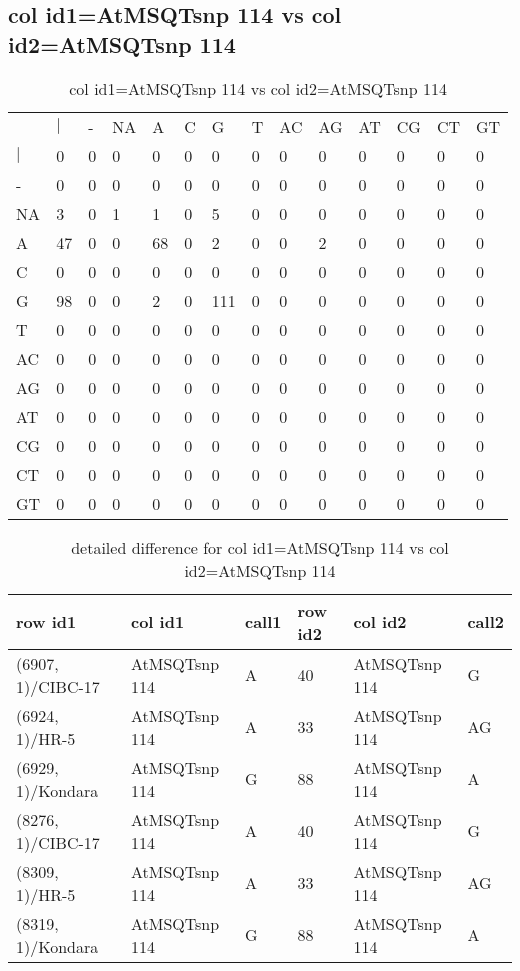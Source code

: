 \subsection{col id1=AtMSQTsnp 114 vs col id2=AtMSQTsnp 114}
\begin{center}
\begin{longtable}{|l|l|l|l|l|l|l|l|l|l|l|l|l|l|}
\caption{col id1=AtMSQTsnp 114 vs col id2=AtMSQTsnp 114} \label{table_dm694}\\
\hline
\\
\hline
&$|$&-&NA&A&C&G&T&AC&AG&AT&CG&CT&GT\\
$|$&0&0&0&0&0&0&0&0&0&0&0&0&0\\
-&0&0&0&0&0&0&0&0&0&0&0&0&0\\
NA&3&0&1&1&0&5&0&0&0&0&0&0&0\\
A&47&0&0&68&0&2&0&0&2&0&0&0&0\\
C&0&0&0&0&0&0&0&0&0&0&0&0&0\\
G&98&0&0&2&0&111&0&0&0&0&0&0&0\\
T&0&0&0&0&0&0&0&0&0&0&0&0&0\\
AC&0&0&0&0&0&0&0&0&0&0&0&0&0\\
AG&0&0&0&0&0&0&0&0&0&0&0&0&0\\
AT&0&0&0&0&0&0&0&0&0&0&0&0&0\\
CG&0&0&0&0&0&0&0&0&0&0&0&0&0\\
CT&0&0&0&0&0&0&0&0&0&0&0&0&0\\
GT&0&0&0&0&0&0&0&0&0&0&0&0&0\\
\hline
\end{longtable}
\end{center}

\begin{center}
\begin{longtable}{|l|l|l|l|l|l|}
\caption{detailed difference for col id1=AtMSQTsnp 114 vs col id2=AtMSQTsnp 114} \label{table_dm695}\\
\hline
row id1&col id1&call1&row id2&col id2&call2\\
\hline
(6907, 1)/CIBC-17&AtMSQTsnp 114&A&40&AtMSQTsnp 114&G\\
(6924, 1)/HR-5&AtMSQTsnp 114&A&33&AtMSQTsnp 114&AG\\
(6929, 1)/Kondara&AtMSQTsnp 114&G&88&AtMSQTsnp 114&A\\
(8276, 1)/CIBC-17&AtMSQTsnp 114&A&40&AtMSQTsnp 114&G\\
(8309, 1)/HR-5&AtMSQTsnp 114&A&33&AtMSQTsnp 114&AG\\
(8319, 1)/Kondara&AtMSQTsnp 114&G&88&AtMSQTsnp 114&A\\
\hline
\end{longtable}
\end{center}

